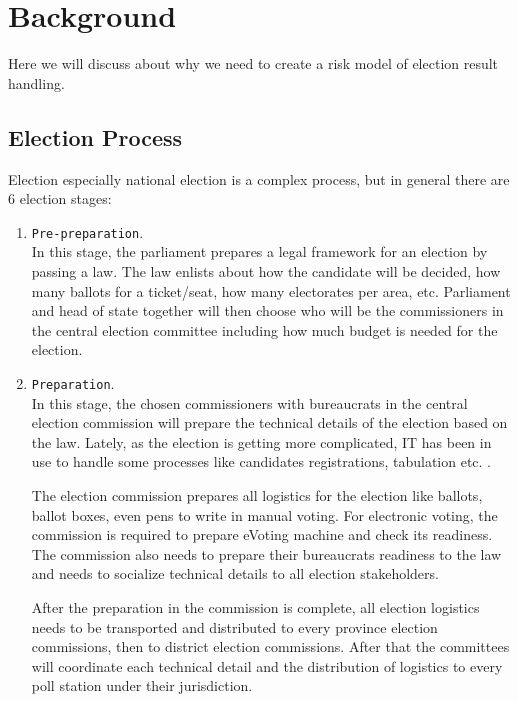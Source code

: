 \documentclass[JIP]{ipsj}
\def\|{\verb|}
\begin{document}
%2
\section{Background}

Here we will discuss about why we need to create a risk model of election result handling.

\subsection{Election Process}%2.1
\label{ElectionProcess}

Election especially national election is a complex process, but in general there are 6 election stages:

\begin{enumerate}%{
\item \|Pre-preparation|.\\
In this stage, the parliament prepares a legal framework for an election by passing a law. The law enlists about how the candidate will be decided, how many ballots for a ticket/seat, how many electorates per area, etc. Parliament and head of state together will then choose who will be the commissioners in the central election committee including how much budget is needed for the election.

\item \|Preparation|.\\
In this stage, the chosen commissioners with bureaucrats in the central election commission will prepare the technical details of the election based on the law. Lately, as the election is getting more complicated, IT has been in use to handle some processes like candidates registrations, tabulation etc. \cite{Budi2008}.

The election commission prepares all logistics for the election like ballots, ballot boxes, even pens to write in manual voting. For electronic voting, the commission is required to prepare eVoting machine and check its readiness. The commission also needs to prepare their bureaucrats readiness to the law and needs to socialize technical details to all election stakeholders.

After the preparation in the commission is complete, all election logistics needs to be transported and distributed to every province election commissions, then to district election commissions. After that the committees will coordinate each technical detail and the distribution of logistics to every poll station under their jurisdiction.


\end{enumerate}
\end{document}
